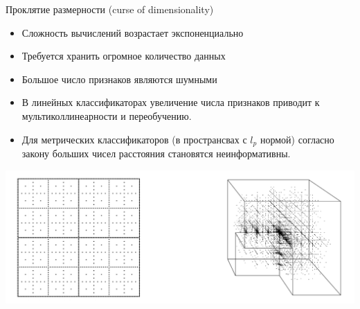 \documentclass[10pt]{beamer}
\begin{document}
\begin{frame}{Проклятие размерности (curse of dimensionality)}
\begin{itemize}
\item Сложность вычислений возрастает экспоненциально
\item Требуется хранить огромное количество данных
\item Большое число признаков являются шумными
\item В линейных классификаторах увеличение числа признаков приводит к
    мультиколлинеарности и переобучению.
\item Для метрических классификаторов (в пространсвах с $l_p$ нормой) согласно
    закону больших чисел расстояния становятся неинформативны.
\end{itemize}

\begin{center}
\includegraphics[scale=0.3]{images/cod.png}
\end{center}

\end{frame}
\end{document}
